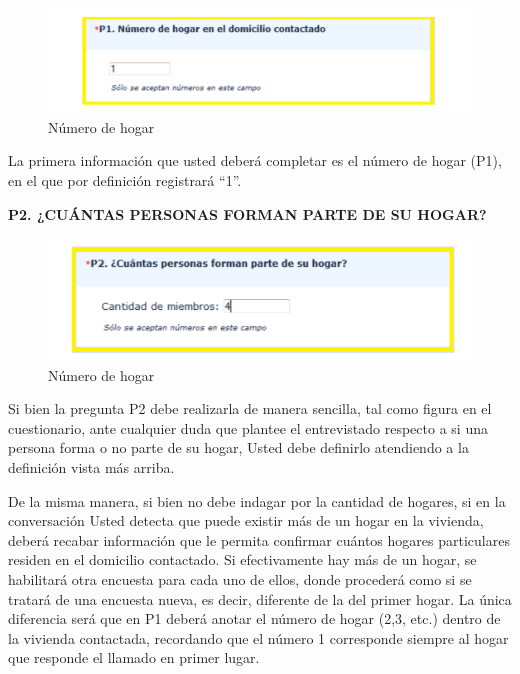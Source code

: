 \documentclass[
  openany]{book}
\begin{document}
\begin{figure}

{\centering \includegraphics[width=1\linewidth]{imagenes/figura6-46} 

}

\caption{Número de hogar}\label{fig:Localcomer567}
\end{figure}

La primera información que usted deberá completar es el número de hogar (P1), en el que por definición registrará ``1''.

\textbf{P2. ¿CUÁNTAS PERSONAS FORMAN PARTE DE SU HOGAR?}

\begin{figure}

{\centering \includegraphics[width=1\linewidth]{imagenes/figura6-47} 

}

\caption{Número de hogar}\label{fig:Localcomer56}
\end{figure}

Si bien la pregunta P2 debe realizarla de manera sencilla, tal como figura en el cuestionario, ante cualquier duda que plantee el entrevistado respecto a si una persona forma o no parte de su hogar, Usted debe definirlo atendiendo a la definición vista más arriba.

De la misma manera, si bien no debe indagar por la cantidad de hogares, si en la conversación Usted detecta que puede existir más de un hogar en la vivienda, deberá recabar información que le permita confirmar cuántos hogares particulares residen en el domicilio contactado. Si efectivamente hay más de un hogar, se habilitará otra encuesta para cada uno de ellos, donde procederá como si se tratará de una encuesta nueva, es decir, diferente de la del primer hogar. La única diferencia será que en P1 deberá anotar el número de hogar (2,3, etc.) dentro de la vivienda contactada, recordando que el número 1 corresponde siempre al hogar que responde el llamado en primer lugar.
\end{document}
